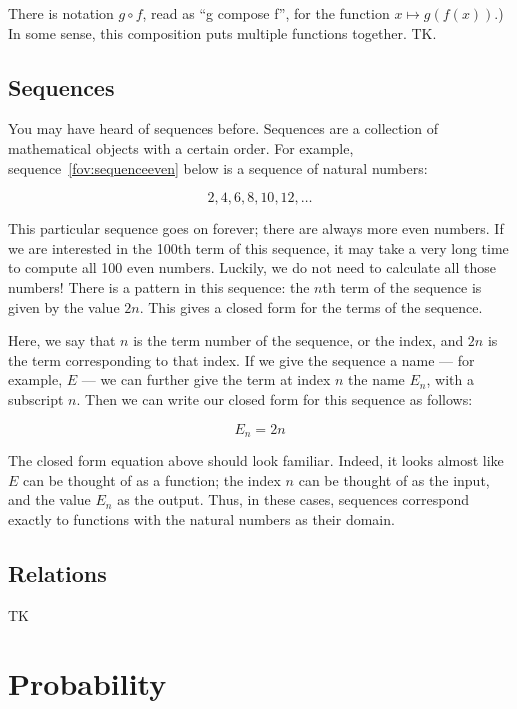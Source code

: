 \documentclass[a4paper,10pt]{report}
\begin{document}
There is notation \(g \circ f\), read as ``g compose f'', for the function \(x \mapsto
g(f(x))\).) In some sense, this composition puts multiple functions together. TK.

\section{Sequences}

You may have heard of sequences before. Sequences are a collection of mathematical objects
with a certain order. For example, sequence~\ref{fov:sequenceeven} below is a sequence of
natural numbers:

\begin{equation}
  2, 4, 6, 8, 10, 12, \dots
  \label{fov:sequenceeven}
\end{equation}

This particular sequence goes on forever; there are always more even numbers. If we are
interested in the 100th term of this sequence, it may take a very long time to compute all
100 even numbers. Luckily, we do not need to calculate all those numbers! There is a pattern
in this sequence: the \(n\)th term of the sequence is given by the value \(2n\). This gives
a closed form for the terms of the sequence.

Here, we say that \(n\) is the term number of the sequence, or the index, and \(2n\) is the
term corresponding to that index. If we give the sequence a name --- for example, \(E\) ---
we can further give the term at index \(n\) the name \(E_n\), with a subscript \(n\). Then
we can write our closed form for this sequence as follows:

\begin{equation*}
  E_n = 2n
\end{equation*}

The closed form equation above should look familiar. Indeed, it looks almost like \(E\) can
be thought of as a function; the index \(n\) can be thought of as the input, and the value
\(E_n\) as the output. Thus, in these cases, sequences correspond exactly to functions with
the natural numbers as their domain.

\section{Relations}

TK



\chapter{Probability}
\end{document}
